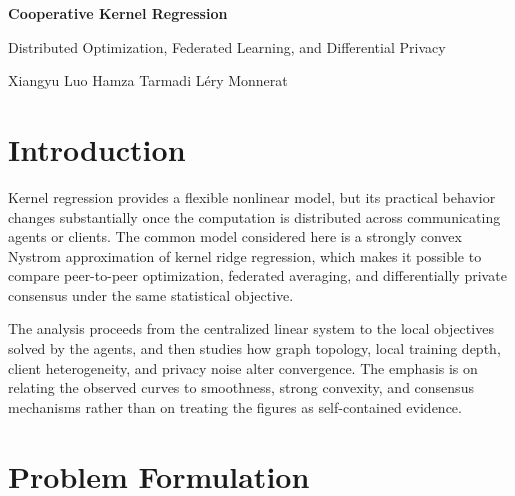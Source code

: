 \documentclass[11pt,a4paper]{article}
\begin{document}
\begin{center}
{\Large\bfseries Cooperative Kernel Regression\par}
\vspace{0.2em}
{\large Distributed Optimization, Federated Learning, and Differential Privacy\par}
\vspace{0.3em}
{\normalsize Xiangyu Luo \quad Hamza Tarmadi \quad L\'ery Monnerat\par}
\end{center}
\vspace{0.4em}

\section{Introduction}
Kernel regression provides a flexible nonlinear model, but its practical behavior changes substantially once the computation is distributed across communicating agents or clients. The common model considered here is a strongly convex Nystrom approximation of kernel ridge regression, which makes it possible to compare peer-to-peer optimization, federated averaging, and differentially private consensus under the same statistical objective.

The analysis proceeds from the centralized linear system to the local objectives solved by the agents, and then studies how graph topology, local training depth, client heterogeneity, and privacy noise alter convergence. The emphasis is on relating the observed curves to smoothness, strong convexity, and consensus mechanisms rather than on treating the figures as self-contained evidence.

\section{Problem Formulation}\label{sec:formulation}
\end{document}
